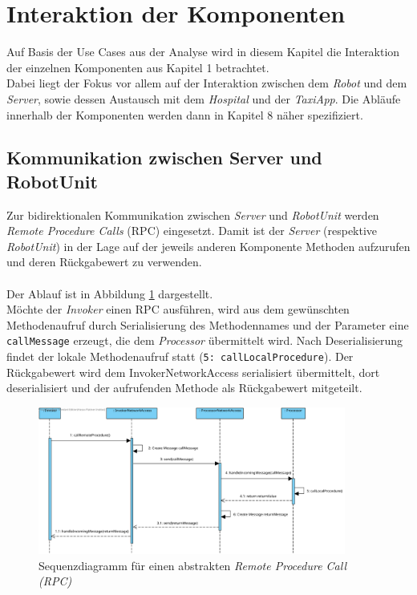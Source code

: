 \section{Interaktion der Komponenten}
Auf Basis der Use Cases aus der Analyse wird in diesem Kapitel die Interaktion der einzelnen Komponenten aus Kapitel 1 betrachtet. \\
Dabei liegt der Fokus vor allem auf der Interaktion zwischen dem \emph{Robot} und dem \emph{Server}, sowie dessen Austausch mit dem \emph{Hospital} und der \emph{TaxiApp}. 
Die Abläufe innerhalb der Komponenten werden dann in Kapitel 8 näher spezifiziert. \\

\subsection*{Kommunikation zwischen Server und RobotUnit}
Zur bidirektionalen Kommunikation zwischen \emph{Server} und \emph{RobotUnit} werden \emph{Remote Procedure Calls} (RPC) eingesetzt. Damit ist der \emph{Server} (respektive \emph{RobotUnit}) in der Lage auf der jeweils anderen Komponente Methoden aufzurufen und deren Rückgabewert zu verwenden. \\ \\
Der Ablauf ist in Abbildung \ref{SequenzDiagrammRPC} dargestellt. \\ Möchte der \emph{Invoker} einen RPC ausführen, wird aus dem gewünschten Methodenaufruf durch Serialisierung des Methodennames und der Parameter eine \texttt{callMessage} erzeugt, die dem \emph{Processor} übermittelt wird. Nach Deserialisierung findet der lokale Methodenaufruf statt (\texttt{5: callLocalProcedure}). Der Rückgabewert wird dem InvokerNetworkAccess serialisiert übermittelt, dort deserialisiert und der aufrufenden Methode als Rückgabewert mitgeteilt.
\begin{figure}[H]
	\centering
	\includegraphics[width=0.9\textwidth]{img/2-Entwurf-Communication_RPC}
	\caption{Sequenzdiagramm für einen abstrakten \emph{Remote Procedure Call (RPC)}}
	\label{SequenzDiagrammRPC}
\end{figure}

